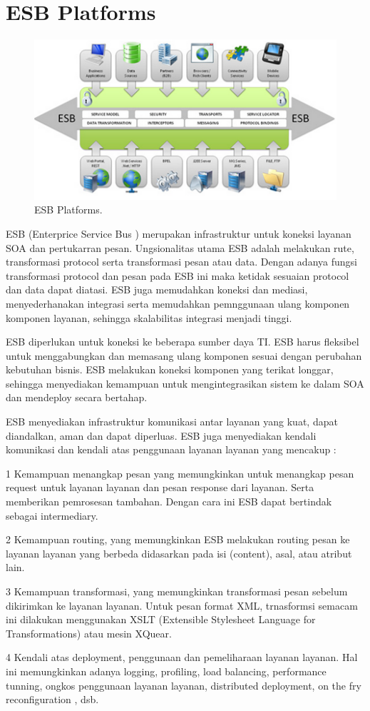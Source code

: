 \documentclass{jtetiproposalskripsi}
\begin{document}
\section{ESB Platforms}
\begin{figure}[ht!]
  \centering
    \includegraphics{gambar/4}
    \caption{ESB Platforms.}
    \label{wsn}
\end{figure}
ESB (Enterprice Service Bus ) merupakan infrastruktur untuk koneksi layanan SOA dan pertukarran pesan. Ungsionalitas utama ESB adalah melakukan rute, transformasi protocol serta transformasi pesan atau data. Dengan adanya fungsi transformasi protocol dan pesan pada ESB ini maka ketidak sesuaian protocol dan data dapat diatasi. ESB juga memudahkan koneksi dan mediasi, menyederhanakan integrasi serta memudahkan pemnggunaan ulang komponen komponen layanan, sehingga skalabilitas integrasi menjadi tinggi.

	ESB diperlukan untuk koneksi ke beberapa sumber daya TI. ESB harus fleksibel untuk menggabungkan dan memasang ulang komponen sesuai dengan perubahan kebutuhan bisnis. ESB melakukan koneksi komponen yang terikat longgar, sehingga menyediakan kemampuan untuk mengintegrasikan sistem ke dalam SOA dan mendeploy secara bertahap.
	
	ESB menyediakan infrastruktur komunikasi antar layanan yang kuat, dapat diandalkan, aman dan dapat diperluas. ESB juga menyediakan kendali komunikasi dan kendali atas penggunaan layanan layanan yang mencakup : 

\begin{flushleft}
\item [1]Kemampuan  menangkap pesan yang memungkinkan untuk menangkap pesan request untuk layanan  layanan dan pesan response dari layanan. Serta memberikan pemrosesan tambahan. Dengan cara ini ESB dapat bertindak sebagai intermediary.
\item [2]Kemampuan routing, yang memungkinkan ESB melakukan routing pesan ke layanan layanan yang berbeda didasarkan pada isi (content), asal, atau atribut lain.
\item [3]Kemampuan transformasi, yang memungkinkan transformasi pesan sebelum dikirimkan ke layanan layanan. Untuk pesan format XML, trnasformsi semacam ini dilakukan menggunakan XSLT (Extensible Stylesheet Language for Transformations) atau mesin XQuear.
\item[4]Kendali atas deployment, penggunaan dan pemeliharaan layanan layanan. Hal ini memungkinkan adanya logging, profiling, load balancing, performance tunning, ongkos penggunaan layanan layanan, distributed deployment, on the fry reconfiguration , dsb.
\end{flushleft}
\end{document}
